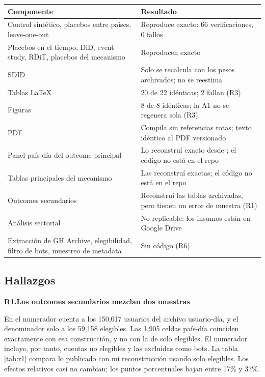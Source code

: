 \documentclass[11pt,a4paper]{article}
\newcommand{\coment}[2]{\medskip\noindent\textbf{#1.\enspace #2}\par\nopagebreak}
\begin{document}
\begin{table}[h]
\small
\begin{tabularx}{\textwidth}{@{}L{6.2cm}Y@{}}
\toprule
Componente & Resultado \\
\midrule
Control sintético, placebos entre países, leave-one-out & Reproduce exacto: 66 verificaciones, 0 fallos \\
Placebos en el tiempo, DiD, event study, RDiT, placebos del mecanismo & Reproducen exacto \\
SDID & Solo se recalcula con los pesos archivados; no se reestima \\
Tablas LaTeX & 20 de 22 idénticas; 2 fallan (R3) \\
Figuras & 8 de 8 idénticas; la A1 no se regenera sola (R3) \\
PDF & Compila sin referencias rotas; texto idéntico al PDF versionado \\
Panel país-día del outcome principal & Lo reconstruí exacto desde ; el código no está en el repo \\
Tablas principales del mecanismo & Las reconstruí exactas; el código no está en el repo \\
Outcomes secundarios & Reconstruí las tablas archivadas, pero tienen un error de muestra (R1) \\
Análisis sectorial & No replicable: los insumos están en Google Drive \\
Extracción de GH Archive, elegibilidad, filtro de bots, muestreo de metadata & Sin código (R6) \\
\bottomrule
\end{tabularx}
\end{table}

\subsection{Hallazgos}

\coment{R1}{Los outcomes secundarios mezclan dos muestras}
En  el numerador cuenta a los
150,017 usuarios del archivo usuario-día, y el denominador solo a los 59,158 elegibles. Las 1,905
celdas país-día coinciden exactamente con esa construcción, y no con la de solo elegibles. El numerador incluye,
por tanto, cuentas no elegibles y las excluidas como bots. La tabla \ref{tab:r1} compara lo publicado
con mi reconstrucción usando solo elegibles. Los efectos relativos casi no cambian; los puntos
porcentuales bajan entre 17\% y 37\%.
\end{document}
